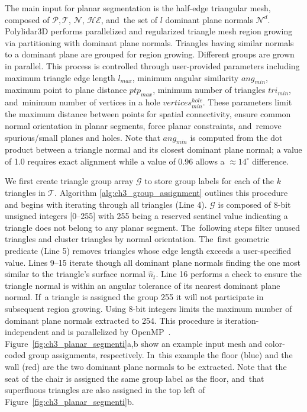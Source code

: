 The main input for planar segmentation is the half-edge triangular mesh, composed of $\mathcal{P}, \mathcal{T}$, $\mathcal{N}$, $\mathcal{HE}$, and~the set of $l$ dominant plane normals $\mathcal{N}^d$. Polylidar3D performs parallelized and regularized triangle mesh region growing via partitioning with dominant plane normals. Triangles having similar normals to a dominant plane are grouped for region growing. Different groups are grown in parallel. This process is controlled through user-provided parameters including maximum triangle edge length $l_{max}$, minimum angular similarity $ang_{min}$, maximum point to plane distance $ptp_{max}$, minimum number of triangles $tri_{min}$, and~minimum number of vertices in a hole $vertices^{hole}_{min}$. These parameters limit the maximum distance between points for spatial connectivity, ensure common normal orientation in planar segments, force planar constraints, and~remove spurious/small planes and holes. Note that $ang_{min}$ is computed from the dot product between a triangle normal and its closest dominant plane normal; a value of 1.0 requires exact alignment while a value of 0.96 allows a $\approx 14^\circ$ difference. 


We first create triangle group array $\mathcal{G}$ to store group labels for each of the $k$ triangles in $\mathcal{T}$. Algorithm \ref{alg:ch3_group_assignment} outlines this procedure and begins with iterating through all triangles (Line 4). $\mathcal{G}$ is composed of 8-bit unsigned integers [0--255] with 255 being a reserved sentinel value indicating a triangle does not belong to any planar segment. The~following steps filter unused triangles and cluster triangles by normal orientation. The~first geometric predicate (Line 5) removes triangles whose edge length exceeds a user-specified value.  Lines 9--15 iterate though all dominant plane normals finding the one most similar to the triangle's surface normal $\hat{n}_t$. Line 16 performs a check to ensure the triangle normal is within an angular tolerance of its nearest dominant plane normal. If~a triangle is assigned the group 255 it will not participate in subsequent region growing. Using 8-bit integers limits the maximum number of dominant plane normals extracted to 254. This procedure is iteration-independent and is parallelized by OpenMP~\cite{dagum_openmp_1998}.  Figure~\ref{fig:ch3_planar_segmenti}a,b show an example input mesh and color-coded group assignments, respectively. In~this example the floor (blue) and the wall (red) are the two dominant plane normals to be extracted. Note that the seat of the chair is assigned the same group label as the floor, and~that superfluous triangles are also assigned in the top left of Figure~\ref{fig:ch3_planar_segmenti}b. 

